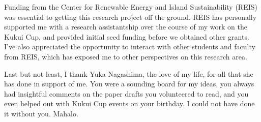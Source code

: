 \begin{acknowledgments}
Funding from the Center for Renewable Energy and Island Sustainability (REIS) was essential to getting this research project off the ground. REIS has personally supported me with a research assistantship over the course of my work on the Kukui Cup, and provided initial seed funding before we obtained other grants. I've also appreciated the opportunity to interact with other students and faculty from REIS, which has exposed me to other perspectives on this research area.

Last but not least, I thank Yuka Nagashima, the love of my life, for all that she has done in support of me. You were a sounding board for my ideas, you always had insightful comments on the paper drafts you volunteered to read, and you even helped out with Kukui Cup events on your birthday. I could not have done it without you. Mahalo.

\end{acknowledgments}
